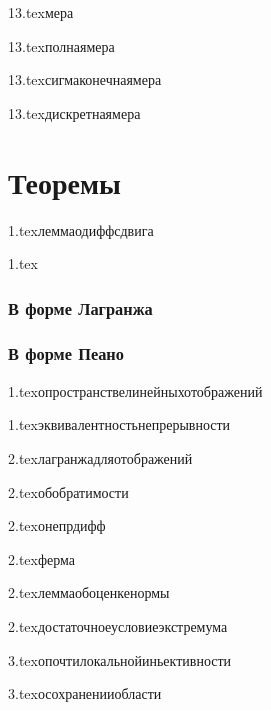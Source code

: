 {13.tex}{мера}

{13.tex}{полнаямера}

{13.tex}{сигмаконечнаямера}

{13.tex}{дискретнаямера}

\section{Теоремы}

{1.tex}{леммаодиффсдвига}

{1.tex}{}
\subsubsection{В форме Лагранжа}
\subsubsection{В форме Пеано}

{1.tex}{опространствелинейныхотображений}

{1.tex}{эквивалентностьнепрерывности}

{2.tex}{лагранжадляотображений}

{2.tex}{обобратимости}

{2.tex}{онепрдифф}

{2.tex}{ферма}

{2.tex}{леммаобоценкенормы}

{2.tex}{достаточноеусловиеэкстремума}

{3.tex}{опочтилокальнойиньективности}

{3.tex}{осохраненииобласти}

